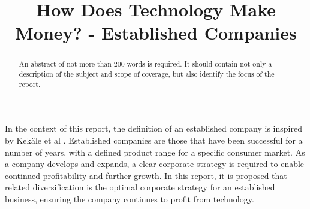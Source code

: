 \documentclass{elec6049Report}     %
\begin{document}
\frontmatter
{}
\title      {How Does Technology Make Money? - Established Companies}


\maketitle

\begin{abstract}
An abstract of not more than 200 words is required. It should contain not only a description of the subject and scope of coverage, but also identify the focus of the report.  
\end{abstract}

\mainmatter
{}

In the context of this report, the definition of an established company is inspired by Kek{\"a}le et al \cite{kekale2007successful}. 
Established companies are those that have been successful for a number of years, with a defined product range for a specific consumer market. 
As a company develops and expands, a clear corporate strategy is required to enable continued profitability and further growth.
In this report, it is proposed that related diversification is the optimal corporate strategy for an established business, ensuring the company continues to profit from technology.
\end{document}
